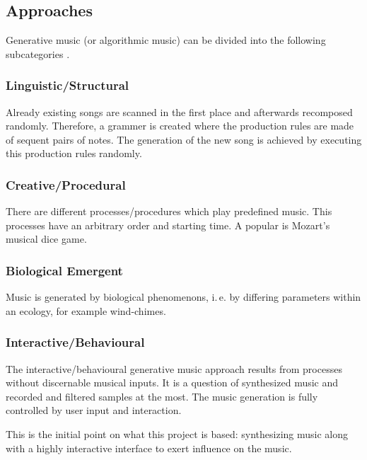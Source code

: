 	\subsection{Approaches} 

	Generative music (or algorithmic music) can be divided into the following subcategories \cite{Wooller2005}.

	\subsubsection{Linguistic/Structural}

	Already existing songs are scanned in the first place and afterwards recomposed randomly. Therefore, a grammer is created where the production rules are made of sequent pairs of notes. The generation of the new song is achieved by executing this production rules randomly.

	\subsubsection{Creative/Procedural}

	There are different processes/procedures which play predefined music. This processes have an arbitrary order and starting time. A popular is Mozart's musical dice game. 

	\subsubsection{Biological Emergent}

	Music is generated by biological phenomenons, i.\,e. by differing parameters within an ecology, for example wind-chimes.

	\subsubsection{Interactive/Behavioural}

	The interactive/behavioural generative music approach results from processes without discernable musical inputs. It is a question of synthesized music and recorded and filtered samples at the most. The music generation is fully controlled by user input and interaction.
	
	This is the initial point on what this project is based: synthesizing music along with a highly interactive interface to exert influence on the music.

